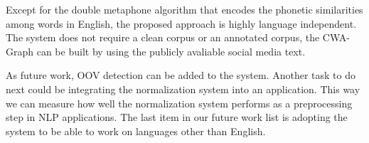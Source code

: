 \documentclass[a4paper,onesided,12pt]{report}
\begin{document}
Except for the double metaphone algorithm that encodes the phonetic similarities among words in English, the proposed approach is highly language independent. The system does not require a clean corpus or an annotated corpus, the CWA-Graph can be built by using the publicly avaliable social media text.

As future work, OOV detection can be added to the system. Another task to do next could be integrating the normalization system into an application. This way we can measure how well the normalization system performs as a preprocessing step in NLP applications. The last item in our future work list is adopting the system to be able to work on languages  other than English.


%


\end{document}
